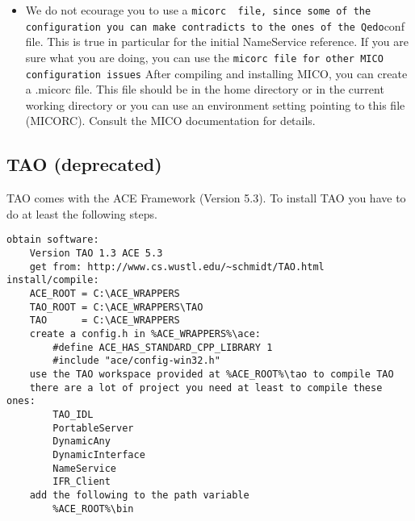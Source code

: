 \documentclass[12pt,a4paper]{report}
\begin{document}
\begin{itemize}
    \item We do not ecourage you to use a \verb .micorc  file, since some of the configuration you can make contradicts to the ones of the Qedo.conf file. This is true in particular for the initial NameService reference. If you are sure what you are doing, you can use the \verb .micorc file for other MICO configuration issues. After compiling and installing MICO, you can create a .micorc file. This file should be in the home directory or in the current working directory or you can use an environment setting pointing to this file (MICORC). Consult the MICO documentation for details.

\end{itemize}

\subsection{TAO (deprecated)}
\label{sec:TAODeprecated}

TAO comes with the ACE Framework (Version 5.3).
To install TAO you have to do at least the following steps.
\small
\begin{verbatim}
obtain software:
    Version TAO 1.3 ACE 5.3
    get from: http://www.cs.wustl.edu/~schmidt/TAO.html
install/compile:
    ACE_ROOT = C:\ACE_WRAPPERS
    TAO_ROOT = C:\ACE_WRAPPERS\TAO
    TAO      = C:\ACE_WRAPPERS
    create a config.h in %ACE_WRAPPERS%\ace:
        #define ACE_HAS_STANDARD_CPP_LIBRARY 1
        #include "ace/config-win32.h"
    use the TAO workspace provided at %ACE_ROOT%\tao to compile TAO
    there are a lot of project you need at least to compile these ones:
        TAO_IDL
        PortableServer
        DynamicAny
        DynamicInterface
        NameService
        IFR_Client
    add the following to the path variable
        %ACE_ROOT%\bin
\end{verbatim}
\normalsize
\end{document}
